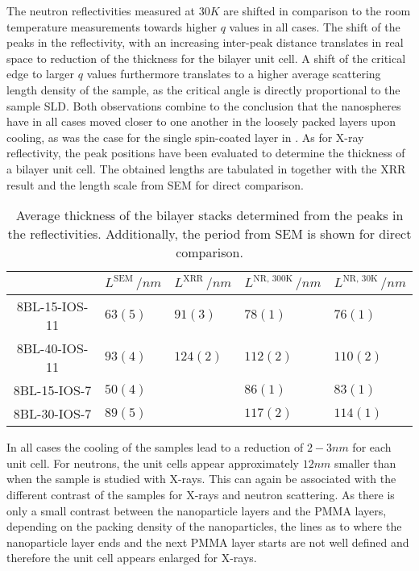 \documentclass[\main/dresen_thesis.tex]{subfiles}
\begin{document}
  The neutron reflectivities measured at $30 \unit{K}$ are shifted in comparison to the room temperature measurements towards higher $q$ values in all cases.
  The shift of the peaks in the reflectivity, with an increasing inter-peak distance translates in real space to reduction of the thickness for the bilayer unit cell.
  A shift of the critical edge to larger $q$ values furthermore translates to a higher average scattering length density of the sample, as the critical angle is directly proportional to the sample SLD.
  Both observations combine to the conclusion that the nanospheres have in all cases moved closer to one another in the loosely packed layers upon cooling, as was the case for the single spin-coated layer in .
  As for X-ray reflectivity, the peak positions have been evaluated to determine the thickness of a bilayer unit cell.
  The obtained lengths are tabulated in  together with the XRR result and the length scale from SEM for direct comparison.

  \begin{table}[tb]
    \centering
    \caption{\label{tab:looselyPackedNP:bilayerStacks:reflPeriodLengths}Average thickness of the bilayer stacks determined from the peaks in the reflectivities. Additionally, the period from SEM is shown for direct comparison.}
    \begin{tabular}{ c | l | l | l | l}
      \rule{0pt}{2ex} & $L^\mathrm{SEM} \, / \unit{nm}$ & $L^\mathrm{XRR} \, / \unit{nm}$ & $L^\mathrm{NR,\,300K}\, / \unit{nm}$ & $L^\mathrm{NR,\,30K}\, / \unit{nm}$ \\
      \hline
      \rule{0pt}{2ex} 8BL-15-IOS-11    & $63(5)$    & $91(3)$     & $78(1)$  & $76(1)$\\
      \rule{0pt}{2ex} 8BL-40-IOS-11    & $93(4)$    & $124(2)$    & $112(2)$ & $110(2)$\\
      \rule{0pt}{2ex} 8BL-15-IOS-7     & $50(4)$    &             & $86(1)$  & $83(1)$\\
      \rule{0pt}{2ex} 8BL-30-IOS-7     & $89(5)$    &             & $117(2)$ & $114(1)$\\
      \hline
    \end{tabular}
  \end{table}

  In all cases the cooling of the samples lead to a reduction of $2 - 3 \unit{nm}$ for each unit cell.
  For neutrons, the unit cells appear approximately $12 \unit{nm}$ smaller than when the sample is studied with X-rays.
  This can again be associated with the different contrast of the samples for X-rays and neutron scattering.
  As there is only a small contrast between the nanoparticle layers and the PMMA layers, depending on the packing density of the nanoparticles, the lines as to where the nanoparticle layer ends and the next PMMA layer starts are not well defined and therefore the unit cell appears enlarged for X-rays.
\end{document}

